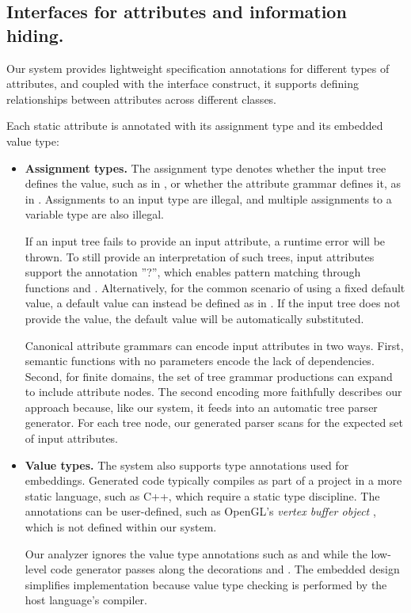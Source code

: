 \subsection{Interfaces for attributes and information hiding.}
Our system provides lightweight specification annotations for different types of attributes, and coupled with the interface construct, it supports defining relationships between attributes across different classes.

Each static attribute is annotated with its assignment type and its embedded value type:
\begin{itemize}
\item \textbf{Assignment types.}
The assignment type denotes whether the input tree defines the value, such as in , or whether the attribute grammar defines it, as in . Assignments to an input type are illegal, and multiple assignments to a variable type are also illegal. 

If an input tree fails to provide an input attribute, a runtime error will be thrown. To still provide an interpretation of such trees, input attributes  support the annotation ''?'',  which enables pattern matching through functions  and .  Alternatively, for the common scenario of using a fixed default value, a default value can instead be defined as in . If the input tree does not provide the value, the default value will be automatically substituted.

Canonical attribute grammars can encode input attributes in two ways. First, semantic functions with no parameters encode the lack of dependencies. Second, for finite domains, the set of tree grammar productions can expand to include attribute nodes. The second encoding more faithfully describes our approach because, like our system, it feeds into an automatic tree parser generator. For each tree node, our generated parser scans for the expected set of input attributes.

\item \textbf{Value types.} 
The system also supports type annotations used for embeddings. Generated code typically compiles as part of a project in a more static language, such as C++, which require a static type discipline. The annotations can be user-defined, such as OpenGL's \emph{vertex buffer object} , which is not defined within our system.

Our analyzer ignores the value type annotations such as  and  while the low-level code generator passes along the decorations  and .  The embedded design simplifies implementation because value type checking is performed by the host language's compiler. 
\end{itemize}

